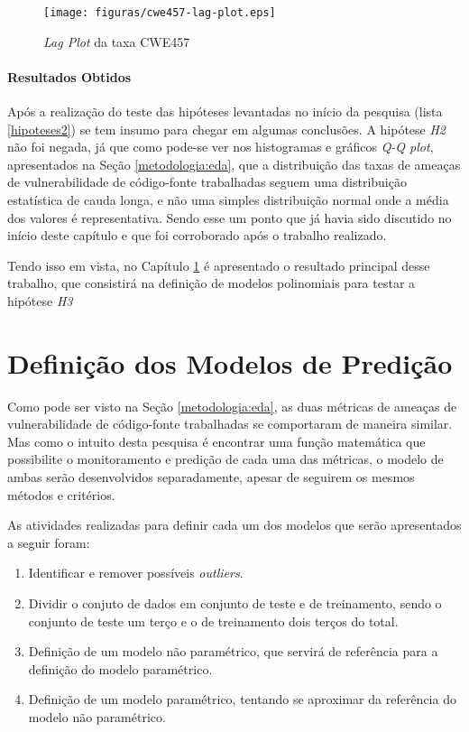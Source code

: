 \begin{figure}[h]
  \centering
  \texttt{[image: figuras/cwe457-lag-plot.eps]}
      \caption{\textit{Lag Plot} da taxa CWE457}
  \label{fig:cwe457-lag-plot}
\end{figure}


\subsubsection{Resultados Obtidos}

Após a realização do teste das hipóteses levantadas no início da pesquisa (lista
\ref{hipoteses2}) se tem insumo para chegar em algumas conclusões. A hipótese
\textit{H2} não foi negada, já que como pode-se ver nos histogramas e gráficos
\textit{Q-Q plot}, apresentados na Seção \ref{metodologia:eda}, que a distribuição das taxas
de ameaças de vulnerabilidade de código-fonte trabalhadas seguem uma
distribuição estatística de cauda longa, e não uma simples distribuição normal
onde a média dos valores é representativa. Sendo esse um ponto que já havia
sido discutido no início deste capítulo e que foi corroborado após o trabalho
realizado.

Tendo isso em vista, no Capítulo \ref{definicaomodelos} é apresentado o
resultado principal desse trabalho, que consistirá na definição de modelos
polinomiais para testar a hipótese \textit{H3}
















\chapter{Definição dos Modelos de Predição}\label{definicaomodelos}

Como pode ser visto na Seção \ref{metodologia:eda}, as duas métricas de ameaças de
vulnerabilidade de código-fonte trabalhadas se comportaram de maneira similar.
Mas como o intuito desta pesquisa é encontrar uma função matemática que
possibilite o monitoramento e predição de cada uma das métricas, o modelo de
ambas serão desenvolvidos separadamente, apesar de seguirem os mesmos métodos e
critérios.

As atividades realizadas para definir cada um dos modelos que serão apresentados a
seguir foram:

\begin{enumerate}
 \item Identificar e remover possíveis \textit{outliers}.
 \item Dividir o conjuto de dados em conjunto de teste e de treinamento, sendo o
  conjunto de teste um terço e o de treinamento dois terços do total.
 \item Definição de um modelo não paramétrico, que servirá de referência para a
  definição do modelo paramétrico.
 \item Definição de um modelo paramétrico, tentando se aproximar da referência
  do modelo não paramétrico.
\end{enumerate}

